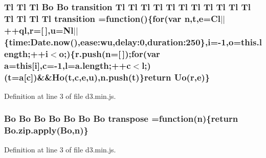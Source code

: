 \subsubsection[{transition}]{ {\bf Tl} {\bf Tl} {\bf Tl} {\bf Bo} {\bf Bo} transition {\bf Tl} {\bf Tl} {\bf Tl} {\bf Tl} {\bf Tl} {\bf Tl} {\bf Tl} {\bf Tl} {\bf Tl} {\bf Tl} {\bf Tl} {\bf Tl} {\bf Tl} {\bf Tl} {\bf Tl} transition =function()\{{\bf for}(var {\bf n},t,{\bf e}={\bf Cl}$\vert$$\vert$++{\bf ql},{\bf r}=[$\,$],u={\bf Nl}$\vert$$\vert$\{{\bf time\+:\+Date.\+now}(),ease\+:wu,delay\+:0,duration\+:250\},{\bf i}=-\/1,{\bf o}=this.\+length;++{\bf i}$<${\bf o};)\{r.\+push({\bf n}=[$\,$]);{\bf for}(var {\bf a}={\bf this}[{\bf i}],{\bf c}=-\/1,l=a.\+length;++{\bf c}$<$l;)(t={\bf a}[{\bf c}])\&\&{\bf Ho}(t,{\bf c},{\bf e},u),n.\+push(t)\}{\bf return} {\bf Uo}({\bf r},{\bf e})\}}\label{d3_8min_8js_a457046cc899c2deb694e4cff1c377b11}


Definition at line 3 of file d3.\+min.\+js.

\subsubsection[{transpose}]{ {\bf Bo} {\bf Bo} {\bf Bo} {\bf Bo} {\bf Bo} {\bf Bo} {\bf Bo} transpose =function({\bf n})\{{\bf return} Bo.\+zip.\+apply({\bf Bo},{\bf n})\}}\label{d3_8min_8js_a3a0623663aea64587cd1d0063cfdeca6}


Definition at line 3 of file d3.\+min.\+js.

